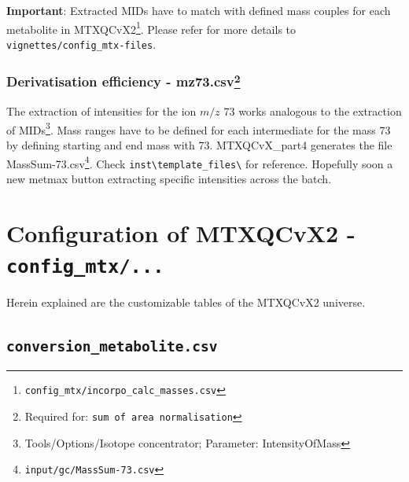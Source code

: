 \documentclass[]{book}
\let\rmarkdownfootnote\footnote%
\def\footnote{\protect\rmarkdownfootnote}
\theoremstyle{definition}
\theoremstyle{definition}
\theoremstyle{definition}
\theoremstyle{remark}
\begin{document}
\textbf{Important}: Extracted MIDs have to match with defined mass
couples for each metabolite in MTXQCvX2\footnote{\texttt{config\_mtx/incorpo\_calc\_masses.csv}}.
Please refer for more details to \texttt{vignettes/config\_mtx-files}.

\subsection[Derivatisation efficiency -
mz73.csv]{\texorpdfstring{Derivatisation efficiency - mz73.csv\footnote{Required
  for: \texttt{sum\ of\ area\ normalisation}}}{Derivatisation efficiency - mz73.csv}}\label{derivatisation-efficiency---mz73.csv}

The extraction of intensities for the ion \(m/z\) 73 works analogous to
the extraction of MIDs\footnote{Tools/Options/Isotope concentrator;
  Parameter: IntensityOfMass}. Mass ranges have to be defined for each
intermediate for the mass 73 by defining starting and end mass with 73.
MTXQCvX\_part4 generates the file MassSum-73.csv\footnote{\texttt{input/gc/MassSum-73.csv}}.
Check \texttt{inst\textbackslash{}template\_files\textbackslash{}} for
reference. Hopefully soon a new metmax button extracting specific
intensities across the batch.

\chapter{\texorpdfstring{Configuration of MTXQCvX2 -
\texttt{config\_mtx/...}}{Configuration of MTXQCvX2 - config\_mtx/...}}\label{configuration-of-mtxqcvx2---config_mtx...}

Herein explained are the customizable tables of the MTXQCvX2 universe.

\section{\texorpdfstring{\texttt{conversion\_metabolite.csv}}{conversion\_metabolite.csv}}\label{conversion_metabolite.csv}
\end{document}
